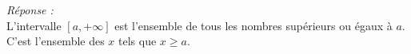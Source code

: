 \textit{Réponse : }\\

L'intervalle $[a,+\infty]$ est l'ensemble de tous les nombres supérieurs ou égaux à $a$. C'est l'ensemble des $x$ tels que $x\geq a$.
